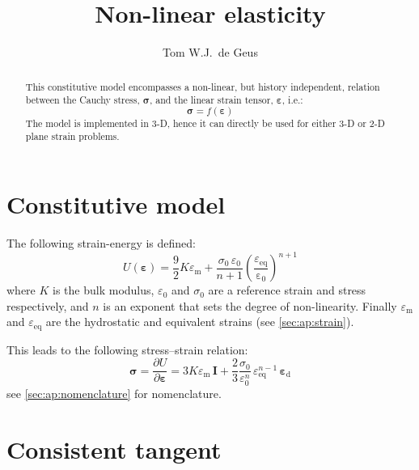 \documentclass[namecite, fleqn]{goose-article}
\title{Non-linear elasticity}
\author{Tom W.J.\ de Geus}
\begin{document}
\maketitle

\begin{abstract}
This constitutive model encompasses a non-linear, but history independent,
relation between the Cauchy stress, $\bm{\sigma}$,
and the linear strain tensor, $\bm{\varepsilon}$, i.e.:
\begin{equation*}
    \bm{\sigma} = f \left( \bm{\varepsilon} \right)
\end{equation*}
The model is implemented in 3-D, hence it can directly be used for either 3-D or
2-D plane strain problems.
\end{abstract}

\section{Constitutive model}

The following strain-energy is defined:
\begin{equation}
    U ( \bm{\varepsilon} )
    = \frac{9}{2} K \varepsilon_\mathrm{m}
    + \frac{ \sigma_0 \, \varepsilon_0 }{ n+1 }
    \left( \frac{\varepsilon_\mathrm{eq}}{\mathrm{\varepsilon_0}} \right)^{n+1}
\end{equation}
where $K$ is the bulk modulus, $\varepsilon_0$ and $\sigma_0$ are a reference strain and
stress respectively, and $n$ is an exponent that sets the degree of non-linearity.
Finally $\varepsilon_\mathrm{m}$ and $\varepsilon_\mathrm{eq}$ are the hydrostatic and
equivalent strains (see \cref{sec:ap:strain}).

This leads to the following stress--strain relation:
\begin{equation}
\label{eq:stress}
    \bm{\sigma}
    = \frac{\partial U}{\partial \bm{\varepsilon}}
    = 3 K \varepsilon_\mathrm{m} \, \bm{I}
    + \frac{2}{3} \frac{\sigma_0}{\varepsilon_0^n} \,
    \varepsilon_\mathrm{eq}^{n-1} \, \bm{\varepsilon}_\mathrm{d}
\end{equation}
see \cref{sec:ap:nomenclature} for nomenclature.

\section{Consistent tangent}
\end{document}
